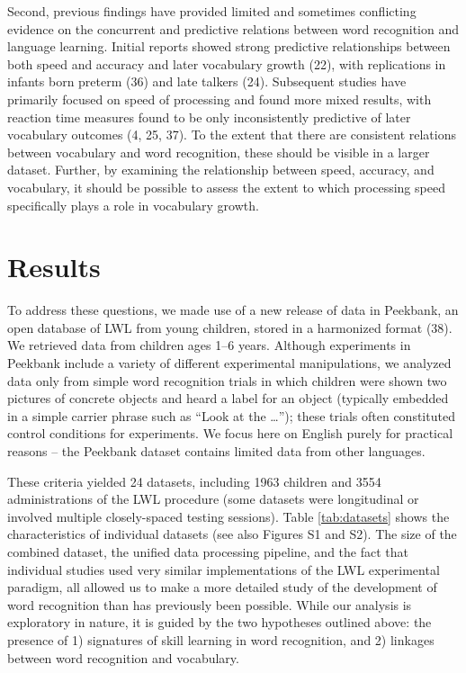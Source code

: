\documentclass[9pt,twocolumn,twoside,]{pnas-new}
\begin{document}
Second, previous findings have provided limited and sometimes
conflicting evidence on the concurrent and predictive relations between
word recognition and language learning. Initial reports showed strong
predictive relationships between both speed and accuracy and later
vocabulary growth (22), with replications in infants born preterm (36)
and late talkers (24). Subsequent studies have primarily focused on
speed of processing and found more mixed results, with reaction time
measures found to be only inconsistently predictive of later vocabulary
outcomes (4, 25, 37). To the extent that there are consistent relations
between vocabulary and word recognition, these should be visible in a
larger dataset. Further, by examining the relationship between speed,
accuracy, and vocabulary, it should be possible to assess the extent to
which processing speed specifically plays a role in vocabulary growth.

\section*{Results}\label{results}

To address these questions, we made use of a new release of data in
Peekbank, an open database of LWL from young children, stored in a
harmonized format (38). We retrieved data from children ages 1--6 years.
Although experiments in Peekbank include a variety of different
experimental manipulations, we analyzed data only from simple word
recognition trials in which children were shown two pictures of concrete
objects and heard a label for an object (typically embedded in a simple
carrier phrase such as ``Look at the \ldots{}''); these trials often
constituted control conditions for experiments. We focus here on English
purely for practical reasons -- the Peekbank dataset contains limited
data from other languages.

These criteria yielded 24 datasets, including 1963 children and 3554
administrations of the LWL procedure (some datasets were longitudinal or
involved multiple closely-spaced testing sessions). Table
\ref{tab:datasets} shows the characteristics of individual datasets (see
also Figures S1 and S2). The size of the combined dataset, the unified
data processing pipeline, and the fact that individual studies used very
similar implementations of the LWL experimental paradigm, all allowed us
to make a more detailed study of the development of word recognition
than has previously been possible. While our analysis is exploratory in
nature, it is guided by the two hypotheses outlined above: the presence
of 1) signatures of skill learning in word recognition, and 2) linkages
between word recognition and vocabulary.
\end{document}
